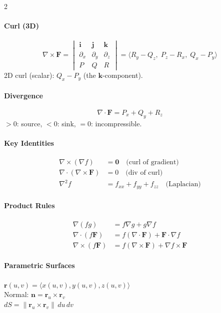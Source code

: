 \begin{multicols}{2}
\paragraph{Curl (3D)}
\[
\nabla\times\mathbf{F} = \begin{vmatrix}\mathbf{i}&\mathbf{j}&\mathbf{k}\\ \partial_x & \partial_y & \partial_z \\ P & Q & R\end{vmatrix} = \langle R_y\!-\!Q_z,\; P_z\!-\!R_x,\; Q_x\!-\!P_y\rangle
\]
2D curl (scalar): $Q_x - P_y$ (the $\mathbf{k}$-component).

\paragraph{Divergence}
\[
\nabla\cdot\mathbf{F} = P_x + Q_y + R_z
\]
$>0$: source, $<0$: sink, $=0$: incompressible.

\paragraph{Key Identities}
\begin{align*}
\nabla\times(\nabla f) &= \mathbf{0} \quad\text{(curl of gradient)}\\
\nabla\cdot(\nabla\times\mathbf{F}) &= 0 \quad\text{(div of curl)}\\
\nabla^2 f &= f_{xx}+f_{yy}+f_{zz} \quad\text{(Laplacian)}
\end{align*}

\paragraph{Product Rules}
\begin{align*}
\nabla(fg) &= f\nabla g + g\nabla f\\
\nabla\cdot(f\mathbf{F}) &= f(\nabla\cdot\mathbf{F}) + \mathbf{F}\cdot\nabla f\\
\nabla\times(f\mathbf{F}) &= f(\nabla\times\mathbf{F}) + \nabla f\times\mathbf{F}
\end{align*}

\paragraph{Parametric Surfaces}
$\mathbf{r}(u,v) = \langle x(u,v),y(u,v),z(u,v)\rangle$\\
Normal: $\mathbf{n} = \mathbf{r}_u\times\mathbf{r}_v$\\
$dS = \|\mathbf{r}_u\times\mathbf{r}_v\|\,du\,dv$


\end{multicols}
